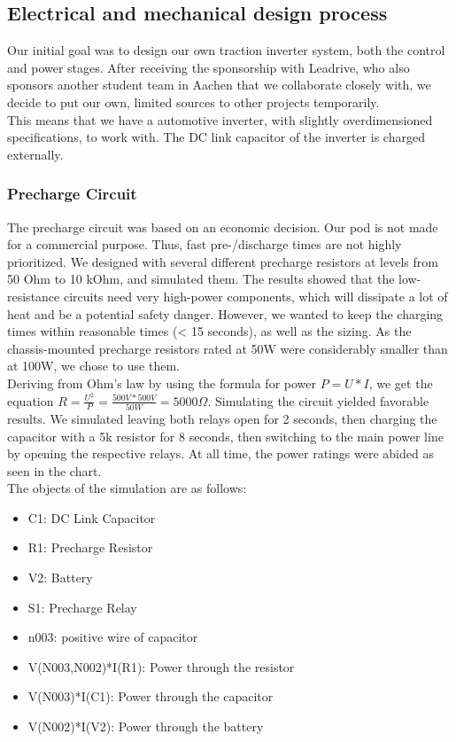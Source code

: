 \subsection{Electrical and mechanical design process}
Our initial goal was to design our own traction inverter system, both the control and power stages. 
After receiving the sponsorship with 
Leadrive, who also sponsors another student team
in Aachen that we collaborate closely with,
we decide to put our own, limited sources to other
projects temporarily. \\
This means that we have a automotive inverter,
with slightly overdimensioned specifications,
to work with. The DC link capacitor of the inverter is charged externally. \\
\subsubsection*{Precharge Circuit}
The precharge circuit was based on an economic decision. Our pod is not made for a commercial purpose. Thus, fast pre-/discharge times are not highly prioritized. We designed with several different precharge resistors at levels from 50 Ohm to 10 kOhm, and simulated them. The results showed that the low-resistance circuits need very high-power components, which will dissipate a lot of heat and be a potential safety danger. However, we wanted to keep the charging times within reasonable times (< 15 seconds), as well as the sizing. As the chassis-mounted precharge resistors rated at 50W were considerably smaller than at 100W, we chose to use them. \\
Deriving from Ohm's law by using the formula for power \(P = U*I\), we get the equation \(R = \frac{U^2}{P} = \frac{500V*500V}{50W} = 5000 \Omega \). Simulating the circuit yielded favorable results. We simulated leaving both relays open for 2 seconds, then charging the capacitor with a 5k resistor for 8 seconds, then switching to the main power line by opening the respective relays. At all time, the power ratings were abided as seen in the chart.  \\
The objects of the simulation are as follows: 
\begin{itemize}
    \item C1: DC Link Capacitor
    \item R1: Precharge Resistor
    \item V2: Battery
    \item S1: Precharge Relay
    \item n003: positive wire of capacitor
    \item V(N003,N002)*I(R1): Power through the resistor
    \item V(N003)*I(C1): Power through the capacitor
    \item V(N002)*I(V2): Power through the battery
\end{itemize}
    
